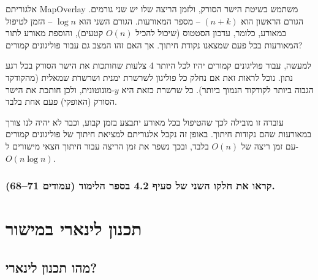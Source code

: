 \documentclass[
]{book}
\begin{document}
אלגוריתם MapOverlay משתמש בשיטת הישר הסורק, ולזמן הריצה שלו יש שני גורמים. הגורם הראשון הוא \(( n + k )\) -- מספר המאורעות. הגורם השני הוא \(\log n\) -- הזמן לטיפול במאורע, כלומר, עדכון הסטטוס (שיכול להכיל \(O ( n )\) קטעים), והוספת מאורע לתור המאורעות בכל פעם שמצאנו נקודת חיתוך. אך האם זהו המצב גם עבור פוליגונים קמורים?

למעשה, עבור פוליגונים קמורים יהיו לכל היותר 4 צלעות שחותכות את הישר הסורק בכל רגע נתון. נוכל לראות זאת אם נחלק כל פוליגון לשרשרת ימנית ושרשרת שמאלית (מהקודקד הגבוה ביותר לקודקוד הנמוך ביותר). כל שרשרת כזאת היא \(y\)-מונוטונית, ולכן חותכת את הישר הסורק (האופקי) פעם אחת בלבד.

עובדה זו מובילה לכך שהטיפול בכל מאורע יתבצע בזמן קבוע, וכבר לא יהיה לנו צורך במאורעות שהם נקודות חיתוך. באופן זה נקבל אלגוריתם למציאת חיתוך של פוליגונים קמורים עם זמן ריצה של \(O ( n )\) בלבד, ובכך נשפר את זמן הריצה עבור חיתוך חצאי מישורים ל-\(O ( n \log n )\).

\hypertarget{ux5e7ux5e8ux5d0ux5d5-ux5d0ux5ea-ux5d7ux5dcux5e7ux5d5-ux5d4ux5e9ux5e0ux5d9-ux5e9ux5dc-ux5e1ux5e2ux5d9ux5e3-4.2-ux5d1ux5e1ux5e4ux5e8-ux5d4ux5dcux5d9ux5deux5d5ux5d3-ux5e2ux5deux5d5ux5d3ux5d9ux5dd-7168.}{%
\subsubsection*{קראו את חלקו השני של סעיף 4.2 בספר הלימוד (עמודים 71--68).}\label{ux5e7ux5e8ux5d0ux5d5-ux5d0ux5ea-ux5d7ux5dcux5e7ux5d5-ux5d4ux5e9ux5e0ux5d9-ux5e9ux5dc-ux5e1ux5e2ux5d9ux5e3-4.2-ux5d1ux5e1ux5e4ux5e8-ux5d4ux5dcux5d9ux5deux5d5ux5d3-ux5e2ux5deux5d5ux5d3ux5d9ux5dd-7168.}}

\hypertarget{ux5eaux5dbux5e0ux5d5ux5df-ux5dcux5d9ux5e0ux5d0ux5e8ux5d9-ux5d1ux5deux5d9ux5e9ux5d5ux5e8}{%
\section{תכנון לינארי במישור}\label{ux5eaux5dbux5e0ux5d5ux5df-ux5dcux5d9ux5e0ux5d0ux5e8ux5d9-ux5d1ux5deux5d9ux5e9ux5d5ux5e8}}

\hypertarget{ux5deux5d4ux5d5-ux5eaux5dbux5e0ux5d5ux5df-ux5dcux5d9ux5e0ux5d0ux5e8ux5d9}{%
\subsection{מהו תכנון לינארי?}\label{ux5deux5d4ux5d5-ux5eaux5dbux5e0ux5d5ux5df-ux5dcux5d9ux5e0ux5d0ux5e8ux5d9}}
\end{document}
